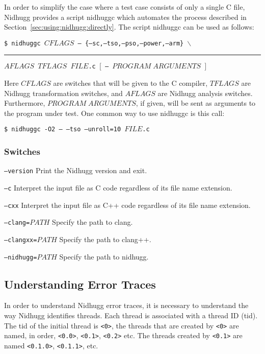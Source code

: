 \documentclass[a4paper]{article}
\begin{document}
In order to simplify the case where a test case consists of only a
single C file, Nidhugg provides a script \textsf{nidhuggc} which
automates the process described in
Section~\ref{sec:using:nidhugg:directly}. The script \textsf{nidhuggc}
can be used as follows:

\vspace{5pt}
\noindent
\texttt{\$ nidhuggc $CFLAGS$ -- \{--sc,--tso,--pso,--power,--arm\} $\backslash$}\\
\rule{20pt}{0pt}\texttt{$AFLAGS$ $TFLAGS$ $FILE$.c $[$ -- $PROGRAM\;ARGUMENTS$ $]$}

\vspace{5pt}\noindent
%
Here $CFLAGS$ are switches that will be given to the C compiler,
$TFLAGS$ are Nidhugg transformation switches, and $AFLAGS$ are Nidhugg
analysis switches. Furthermore, $PROGRAM\;ARGUMENTS$, if given, will
be sent as arguments to the program under test. One common way to use
\textsf{nidhuggc} is this call:

\vspace{5pt}
\noindent
\texttt{\$ nidhuggc -O2 -- --tso --unroll=10 $FILE$.c}

\subsubsection{Switches}

\begin{description}
\item{\texttt{--version}}
%
  Print the Nidhugg version and exit.
\item{\texttt{--c}}
%
  Interpret the input file as C code regardless of its file name
  extension.
\item{\texttt{--cxx}}
%
  Interpret the input file as C++ code regardless of its file name
  extension.
\item{\texttt{--clang=$PATH$}}
%
  Specify the path to \textsf{clang}.
\item{\texttt{--clangxx=$PATH$}}
%
  Specify the path to \textsf{clang++}.
\item{\texttt{--nidhugg=$PATH$}}
%
  Specify the path to \textsf{nidhugg}.
\end{description}

\subsection{Understanding Error Traces}\label{sec:understand:error:traces}

In order to understand Nidhugg error traces, it is necessary to
understand the way Nidhugg identifies threads. Each thread is
associated with a thread ID (tid). The tid of the initial thread is
\texttt{<0>}, the threads that are created by \texttt{<0>} are named,
in order, \texttt{<0.0>}, \texttt{<0.1>}, \texttt{<0.2>} etc. The
threads created by \texttt{<0.1>} are named \texttt{<0.1.0>},
\texttt{<0.1.1>}, etc.
\end{document}
